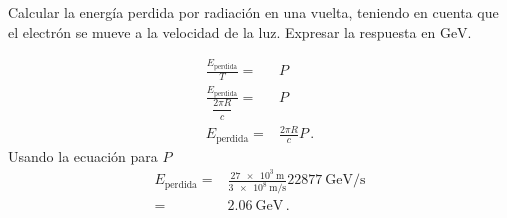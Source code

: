 \documentclass[12pt, a4paper]{article}
\begin{document}
\begin{exercise}[ID=lep-vuelta, tags={banco}]
Calcular la energía perdida por radiación en una vuelta, teniendo en cuenta que el electrón se mueve a la velocidad de la luz. Expresar la respuesta en $\unit{\giga\electronvolt}$.
\end{exercise}
\begin{solution}
\begin{align*}
    \frac{E_{\text{perdida}}}{T} =& P \\
    \frac{E_{\text{perdida}}}{\dfrac{2\pi R}{c}} = & P\\
    E_{\text{perdida}}  = &\frac{2\pi R}{c} P\,.
\end{align*}
Usando la ecuación para $P$
\begin{align*}
    E_{\text{perdida}}  = &\frac{\qty{27e3}{\meter}}{\qty{3e8}{\meter\per\second}}  \qty{22877}{\giga\electronvolt\per\second}\\
    =&\qty{2.06}{\giga\electronvolt}\,.
\end{align*}
\end{solution}
\end{document}
